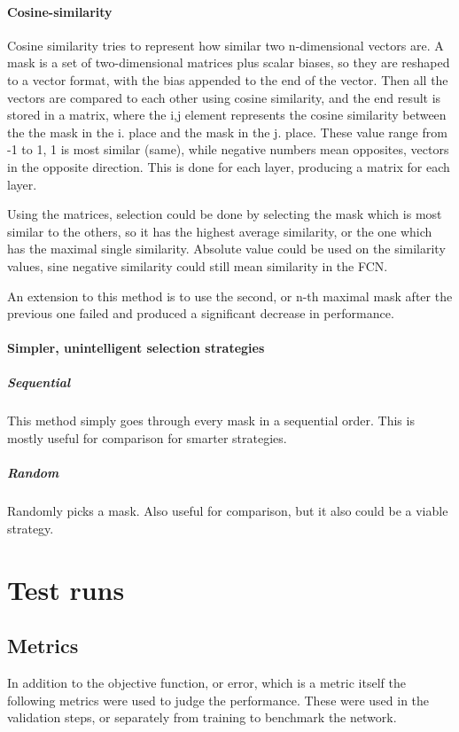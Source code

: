 \documentclass[12pt]{report}
\begin{document}
\subsubsection{Cosine-similarity}Cosine similarity  tries to represent how similar two n-dimensional vectors are. A mask is a set of two-dimensional matrices plus scalar biases, so they are reshaped to a vector format, with the bias appended to the end of the vector. Then all the vectors are compared to each other using cosine similarity, and the end result is stored in a matrix, where the i,j element represents the cosine similarity between the the mask in the i. place and the mask in the j. place. These value range from -1 to 1, 1 is most similar (same), while negative numbers mean opposites, vectors in the opposite direction. This is done for each layer, producing a matrix for each layer.\par
Using the matrices, selection could be done by selecting the mask which is most similar to the others, so it has the highest average similarity, or the one which has the maximal single similarity. Absolute value could be used on the similarity values, sine negative similarity could still mean similarity in the FCN.\par
An extension to this method is to use the second, or n-th maximal mask after the previous one failed and produced a significant decrease in performance.
\subsubsection{Simpler, unintelligent selection strategies}
\paragraph{Sequential}This method simply goes through every mask in a sequential order. This is mostly useful for comparison for smarter strategies.
\paragraph{Random}
Randomly picks a mask. Also useful for comparison, but it also could be a viable strategy.
\chapter{Test runs}
\section{Metrics}
In addition to the objective function, or error, which is a metric itself the following metrics were used to judge the performance. These were used in the validation steps, or separately from training to benchmark the network.
\end{document}
